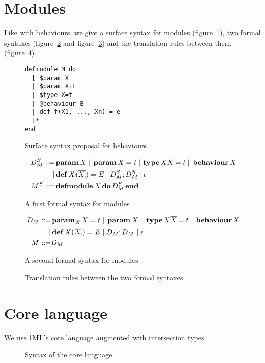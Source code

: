 \documentclass[a4paper,12pt]{article}
\newcommand{\kw}[1]{%
  \,\text{\textbf{#1}}\,
}
\newcommand{\pipe}{%
\; | \;
}
\begin{document}
\section{Modules}
Like with behaviours, we give a surface syntax for modules (figure~\ref{module-surface}), two formal syntaxes (figure~\ref{module-formal1} and figure~\ref{module-formal2}) and the translation rules between them (figure~\ref{module-1to2}).
\begin{figure}[h]
\begin{verbatim}
defmodule M do
  [ $param X
  | $param X=t
  | $type X=t
  | @behaviour B
  | def f(X1, ..., Xn) = e
  ]*
end
\end{verbatim}
\caption{Surface syntax proposal for behaviours}\label{module-surface}
\end{figure}
\begin{figure}[h]
  \begin{align*}
    D_M^S ::=& \kw{param} X \pipe \kw{param} X = t \pipe \kw{type} X \overline{X} = t \pipe \kw{behaviour} X \\
    |& \kw{def} X(\overline{X,}) = E \pipe D_M^S; D_M^S \pipe \epsilon \\
    M^S ::=& \kw{defmodule} X \kw{do} D_M^S \kw{end}
  \end{align*}
  \caption{A first formal syntax for modules}\label{module-formal1}
\end{figure}
\begin{figure}[h]
  \begin{align*}
    D_M ::=&\,\text{\textbf{param}}_X\, X = t \pipe \kw{param} X \pipe \,\kw{type}X \overline{X}=t\pipe \kw{behaviour} X\\
    |& \kw{def} X(\overline{X,}) = E \pipe D_M; D_M \pipe \epsilon \\
    M ::=& D_M
  \end{align*}
  \caption{A second formal syntax for modules}\label{module-formal2}
\end{figure}
\begin{figure}[h]
  \caption{Translation rules between the two formal syntaxes}\label{module-1to2}
\end{figure}
\section{Core language}
We use 1ML's core language augmented with intersection types.
\begin{figure}[h]
  \caption{Syntax of the core language}
\end{figure}
\end{document}

